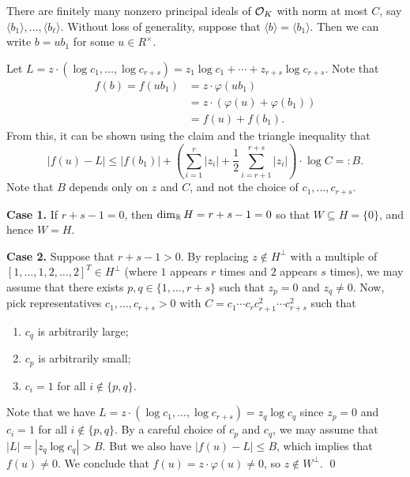 \begin{pf}
    There are finitely many nonzero principal ideals of ${\cal O}_K$ 
    with norm at most $C$, say $\langle b_1 \rangle, \dots, \langle b_\ell \rangle$. 
    Without loss of generality, suppose that $\langle b \rangle = \langle b_1 \rangle$. 
    Then we can write $b = ub_1$ for some $u \in R^\times$. 
    
    Let $L = z \cdot (\log c_1, \dots, \log c_{r+s}) = z_1 \log c_1 + \cdots + z_{r+s} \log c_{r+s}$. Note that 
    \begin{align*}
        f(b) = f(ub_1) &= z \cdot \varphi(ub_1) \\ 
        &= z \cdot (\varphi(u) + \varphi(b_1)) \\
        &= f(u) + f(b_1). 
    \end{align*}
    From this, it can be shown using the claim and the triangle inequality that 
    \[ |f(u) - L| \leq |f(b_1)| + \left( \sum_{i=1}^r |z_i| + \frac12 \sum_{i=r+1}^{r+s} |z_i| \right) 
    \cdot \log C =: B. \] 
    Note that $B$ depends only on $z$ and $C$, and not the choice of 
    $c_1, \dots, c_{r+s}$.

    {\bf Case 1.} If $r + s - 1 = 0$, then $\dim_{\mathbb{R}} H = r + s - 1 = 0$ 
    so that $W \subseteq H = \{0\}$, and hence $W = H$. 

    {\bf Case 2.} Suppose that $r + s - 1 > 0$. By replacing $z \notin H^\perp$
    with a multiple of $[1, \dots, 1, 2, \dots, 2]^T \in H^\perp$ 
    (where $1$ appears $r$ times and $2$ appears $s$ times), we 
    may assume that there exists $p, q \in \{1, \dots, r+s\}$ such that 
    $z_p = 0$ and $z_q \neq 0$. Now, pick representatives $c_1, \dots, 
    c_{r+s} > 0$ with $C = c_1 \cdots c_r c_{r+1}^2 \cdots c_{r+s}^2$ such that 
    \begin{enumerate}[(1)]
        \item $c_q$ is arbitrarily large; 
        \item $c_p$ is arbitrarily small; 
        \item $c_i = 1$ for all $i \notin \{p, q\}$. 
    \end{enumerate}
    Note that we have $L = z \cdot (\log c_1, \dots, \log c_{r+s}) 
    = z_q \log c_q$ since $z_p = 0$ and $c_i = 1$ for all $i \notin \{p, q\}$. 
    By a careful choice of $c_p$ and $c_q$, we may assume that $|L| = |z_q \log c_q| > B$. 
    But we also have $|f(u) - L| \leq B$, which implies that $f(u) \neq 0$. 
    We conclude that $f(u) = z \cdot \varphi(u) \neq 0$, so $z \notin W^\perp$. \qed 
\end{pf}\newpage  


